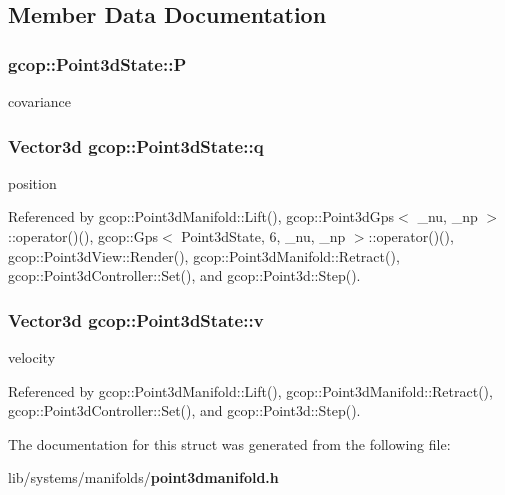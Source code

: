 \subsection{\-Member \-Data \-Documentation}
\subsubsection[{\-P}]{ {\bf gcop\-::\-Point3d\-State\-::\-P}}\label{structgcop_1_1Point3dState_a5bebf4c2e7dba4be6cf614cda24839bc}


covariance 

\subsubsection[{q}]{\setlength{\rightskip}{0pt plus 5cm}\-Vector3d {\bf gcop\-::\-Point3d\-State\-::q}}\label{structgcop_1_1Point3dState_a6277c6e634878579c6937c00156173c9}


position 



\-Referenced by gcop\-::\-Point3d\-Manifold\-::\-Lift(), gcop\-::\-Point3d\-Gps$<$ \-\_\-nu, \-\_\-np $>$\-::operator()(), gcop\-::\-Gps$<$ Point3d\-State, 6, \-\_\-nu, \-\_\-np $>$\-::operator()(), gcop\-::\-Point3d\-View\-::\-Render(), gcop\-::\-Point3d\-Manifold\-::\-Retract(), gcop\-::\-Point3d\-Controller\-::\-Set(), and gcop\-::\-Point3d\-::\-Step().

\subsubsection[{v}]{\setlength{\rightskip}{0pt plus 5cm}\-Vector3d {\bf gcop\-::\-Point3d\-State\-::v}}\label{structgcop_1_1Point3dState_a76a73ca0aff5d0d8298fb3a821698798}


velocity 



\-Referenced by gcop\-::\-Point3d\-Manifold\-::\-Lift(), gcop\-::\-Point3d\-Manifold\-::\-Retract(), gcop\-::\-Point3d\-Controller\-::\-Set(), and gcop\-::\-Point3d\-::\-Step().



\-The documentation for this struct was generated from the following file\-:\begin{DoxyCompactItemize}
\item 
lib/systems/manifolds/{\bf point3dmanifold.\-h}\end{DoxyCompactItemize}

